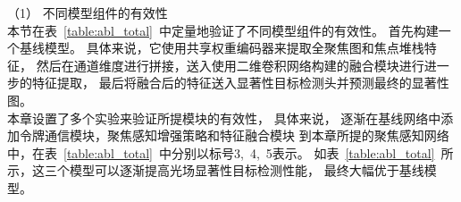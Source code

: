 %
%
%
（1）
不同模型组件的有效性
\\
%
%
%
%
\indent
本节在表~\ref{table:abl_total}~中定量地验证了不同模型组件的有效性。
首先构建一个基线模型。 
具体来说，它使用共享权重编码器来提取全聚焦图和焦点堆栈特征，
然后在通道维度进行拼接，送入使用二维卷积网络构建的融合模块进行进一步的特征提取，
最后将融合后的特征送入显著性目标检测头并预测最终的显著性图。 
\\
%
%
%
%
\indent
本章设置了多个实验来验证所提模块的有效性，
具体来说，
逐渐在基线网络中添加令牌通信模块，聚焦感知增强策略和特征融合模块
到本章所提的聚焦感知网络中，在表~\ref{table:abl_total}~中分别以标号3,~4,~5表示。
如表~\ref{table:abl_total}~所示，这三个模型可以逐渐提高光场显著性目标检测性能，
最终大幅优于基线模型。 
